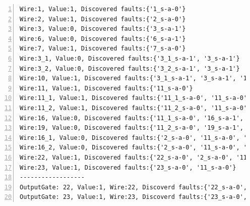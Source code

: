 \begin{latin}
\begin{lstlisting}[numbers=left, breaklines=true]
Wire:1, Value:1, Discovered faults:{'1_s-a-0'} 
Wire:2, Value:1, Discovered faults:{'2_s-a-0'} 
Wire:3, Value:0, Discovered faults:{'3_s-a-1'} 
Wire:6, Value:0, Discovered faults:{'6_s-a-1'} 
Wire:7, Value:1, Discovered faults:{'7_s-a-0'} 
Wire:3_1, Value:0, Discovered faults:{'3_1_s-a-1', '3_s-a-1'} 
Wire:3_2, Value:0, Discovered faults:{'3_2_s-a-1', '3_s-a-1'} 
Wire:10, Value:1, Discovered faults:{'3_1_s-a-1', '3_s-a-1', '10_s-a-0'} 
Wire:11, Value:1, Discovered faults:{'11_s-a-0'} 
Wire:11_1, Value:1, Discovered faults:{'11_1_s-a-0', '11_s-a-0'} 
Wire:11_2, Value:1, Discovered faults:{'11_2_s-a-0', '11_s-a-0'} 
Wire:16, Value:0, Discovered faults:{'11_1_s-a-0', '16_s-a-1', '2_s-a-0', '11_s-a-0'} 
Wire:19, Value:0, Discovered faults:{'11_2_s-a-0', '19_s-a-1', '11_s-a-0', '7_s-a-0'} 
Wire:16_1, Value:0, Discovered faults:{'2_s-a-0', '11_s-a-0', '11_1_s-a-0', '16_s-a-1', '16_1_s-a-1'} 
Wire:16_2, Value:0, Discovered faults:{'2_s-a-0', '11_s-a-0', '16_2_s-a-1', '11_1_s-a-0', '16_s-a-1'} 
Wire:22, Value:1, Discovered faults:{'22_s-a-0', '2_s-a-0', '11_1_s-a-0', '16_s-a-1', '16_1_s-a-1', '11_s-a-0'} 
Wire:23, Value:1, Discovered faults:{'23_s-a-0', '11_s-a-0'} 
------------------
OutputGate: 22, Value:1, Wire:22, Discoverd faults:{'22_s-a-0', '2_s-a-0', '11_1_s-a-0', '16_s-a-1', '16_1_s-a-1', '11_s-a-0'} 
OutputGate: 23, Value:1, Wire:23, Discoverd faults:{'23_s-a-0', '11_s-a-0'} 
\end{lstlisting}
\end{latin}

